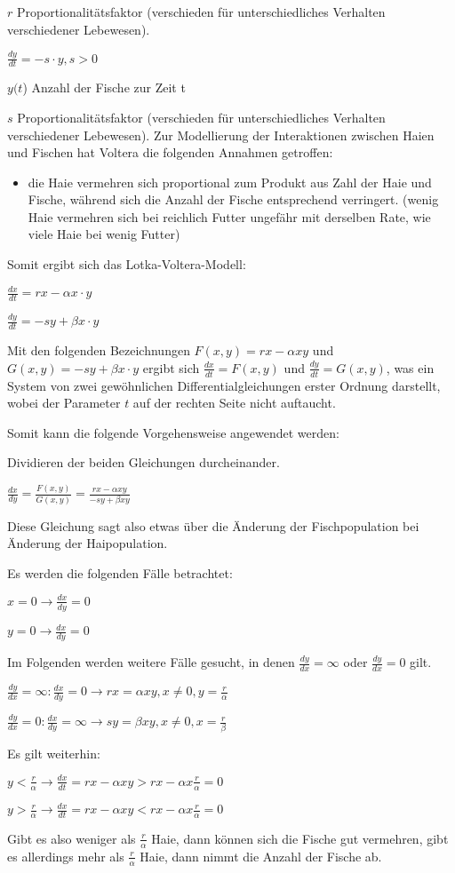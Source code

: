 \documentclass[fontset=ubuntu,11pt,a4paper,fleqn,headsepline]{scrreprt}
\begin{document}
\begin{multicols}{2}
    $r$ Proportionalitätsfaktor (verschieden für unterschiedliches Verhalten verschiedener Lebewesen).
    
    \(\frac{dy}{dt}=-s\cdot y, s>0\)
    
    $y(t$) Anzahl der Fische zur Zeit t
    
    $s$ Proportionalitätsfaktor (verschieden für unterschiedliches Verhalten verschiedener Lebewesen).
    Zur Modellierung der Interaktionen zwischen Haien und Fischen hat Voltera die folgenden Annahmen getroffen:
    \begin{itemize}
        \item die Haie vermehren sich proportional zum Produkt aus Zahl der Haie und Fische, während sich die Anzahl der Fische entsprechend verringert. (wenig Haie vermehren sich bei reichlich Futter ungefähr mit derselben Rate, wie viele Haie bei wenig Futter)
    \end{itemize}
    Somit ergibt sich das Lotka-Voltera-Modell:
    
    \(\frac{dx}{dt}=rx-\alpha x\cdot y\)

    \(\frac{dy}{dt}=-sy+\beta x\cdot y\)

    Mit den folgenden Bezeichnungen $F(x,y)=rx-\alpha xy$ und  $G(x,y)=-sy+\beta x\cdot y$ ergibt sich $\frac{dx}{dt}=F(x,y)$ und $\frac{dy}{dt}=G(x,y)$, was ein System von zwei gewöhnlichen Differentialgleichungen erster Ordnung darstellt, wobei der Parameter $t$ auf der rechten Seite nicht auftaucht.
    
    Somit kann die folgende Vorgehensweise angewendet werden:
    
    Dividieren der beiden Gleichungen durcheinander.

    \(\frac{dx}{dy}=\frac{F(x,y)}{G(x,y)}=\frac{rx-\alpha xy}{-sy+\beta xy}\)

    Diese Gleichung sagt also etwas über die Änderung der Fischpopulation bei Änderung der Haipopulation.
    
    Es werden die folgenden Fälle betrachtet:
    
    \(x=0\rightarrow \frac{dx}{dy}=0\)

    \(y=0\rightarrow \frac{dx}{dy}=0\)

    Im Folgenden werden weitere Fälle gesucht, in denen $\frac{dy}{dx}=\infty$ oder $\frac{dy}{dx}=0$ gilt.
    
    \(\frac{dy}{dx}=\infty: \frac{dx}{dy}=0 \rightarrow rx=\alpha xy, x\neq0, y=\frac{r}{\alpha}\)

    \(\frac{dy}{dx}=0: \frac{dx}{dy}=\infty \rightarrow sy=\beta xy, x\neq0, x=\frac{r}{\beta}\)

    Es gilt weiterhin: 
    
    \(y<\frac{r}{\alpha}\rightarrow \frac{dx}{dt}=rx-\alpha xy>rx-\alpha x\frac{r}{\alpha}=0\)

    \(y>\frac{r}{\alpha}\rightarrow \frac{dx}{dt}=rx-\alpha xy<rx-\alpha x\frac{r}{\alpha}=0\)
    
    Gibt es also weniger als $\frac{r}{\alpha}$ Haie, dann können sich die Fische gut vermehren, gibt es allerdings mehr als $\frac{r}{\alpha}$ Haie, dann nimmt die Anzahl der Fische ab.
    \end{multicols}
 
\end{document}
